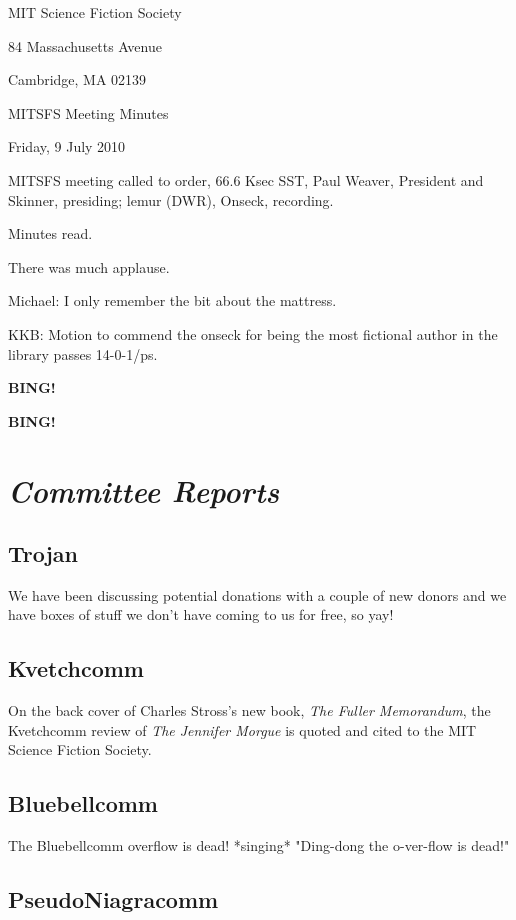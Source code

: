 \documentclass[10pt]{article}
\newcommand{\bing}{{\bf BING!} }
\newcommand{\goto}[1]{\bing \vskip 12pt \section*{{\em{#1}}}}
\newcommand{\skinner}{Paul Weaver, President and Skinner}
\newcommand{\onseck}{lemur (DWR), Onseck}
\newcommand{\meetingdate}{Friday, 9 July 2010}
\begin{document}
\begin{center}

MIT Science Fiction Society

84 Massachusetts Avenue

Cambridge, MA 02139

\vspace{12pt}

MITSFS Meeting Minutes

\meetingdate

\end{center}

\vspace{18pt}

\setlength{\parskip}{6pt}

\noindent
MITSFS meeting called to order, 66.6 Ksec SST,
\skinner, presiding; \onseck, recording.

Minutes read.

There was much applause.

Michael: I only remember the bit about the mattress.

KKB: Motion to commend the onseck for being the most fictional
author in the library passes 14-0-1/ps.

\bing

\goto{Committee Reports}

\subsection*{Trojan}

We have been discussing potential donations with a couple of new donors
and we have boxes of stuff we don't have coming to us for free, so yay!

\subsection*{Kvetchcomm}

On the back cover of Charles Stross's new book, \textit{The Fuller Memorandum},
the Kvetchcomm review of \textit{The Jennifer Morgue} is quoted and cited
to the MIT Science Fiction Society.

\subsection*{Bluebellcomm}

The Bluebellcomm overflow is dead!  *singing* "Ding-dong the o-ver-flow is
dead!"

\subsection*{PseudoNiagracomm}
\end{document}
